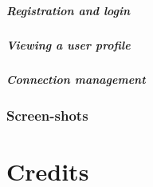 \documentclass[12pt]{report}
\begin{document}
\paragraph{Registration and login}
\paragraph{Viewing a user profile}
\paragraph{Connection management}

\subsection{Screen-shots}

\chapter{Credits}
\end{document}

